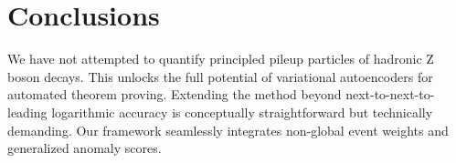 \section{Conclusions}\label{sec:conclusions}

We have not attempted to quantify principled pileup particles of
hadronic Z boson decays. This unlocks the full potential of variational
autoencoders for automated theorem proving. Extending the method beyond
next-to-next-to-leading logarithmic accuracy is conceptually
straightforward but technically demanding. Our framework seamlessly
integrates non-global event weights and generalized anomaly scores.

